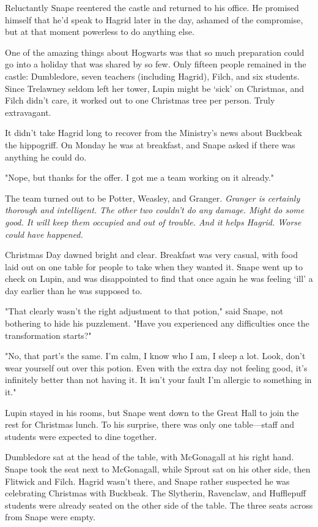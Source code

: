 Reluctantly Snape reentered the castle and returned to his office. He promised himself that he'd speak to Hagrid later in the day, ashamed of the compromise, but at that moment powerless to do anything else.

One of the amazing things about Hogwarts was that so much preparation could go into a holiday that was shared by so few. Only fifteen people remained in the castle: Dumbledore, seven teachers (including Hagrid), Filch, and six students. Since Trelawney seldom left her tower, Lupin might be `sick' on Christmas, and Filch didn't care, it worked out to one Christmas tree per person. Truly extravagant.

It didn't take Hagrid long to recover from the Ministry's news about Buckbeak the hippogriff. On Monday he was at breakfast, and Snape asked if there was anything he could do.

"Nope, but thanks for the offer. I got me a team working on it already."

The team turned out to be Potter, Weasley, and Granger. \emph{Granger is certainly thorough and intelligent. The other two{\el} couldn't do any damage. Might do some good. It will keep them occupied and out of trouble. And it helps Hagrid. Worse could have happened.}

Christmas Day dawned bright and clear. Breakfast was very casual, with food laid out on one table for people to take when they wanted it. Snape went up to check on Lupin, and was disappointed to find that once again he was feeling `ill' a day earlier than he was supposed to.

"That clearly wasn't the right adjustment to that potion," said Snape, not bothering to hide his puzzlement. "Have you experienced any difficulties once the transformation starts?"

"No, that part's the same. I'm calm, I know who I am, I sleep a lot. Look, don't wear yourself out over this potion. Even with the extra day not feeling good, it's infinitely better than not having it. It isn't your fault I'm allergic to something in it."

Lupin stayed in his rooms, but Snape went down to the Great Hall to join the rest for Christmas lunch. To his surprise, there was only one table—staff and students were expected to dine together.

Dumbledore sat at the head of the table, with McGonagall at his right hand. Snape took the seat next to McGonagall, while Sprout sat on his other side, then Flitwick and Filch. Hagrid wasn't there, and Snape rather suspected he was celebrating Christmas with Buckbeak. The Slytherin, Ravenclaw, and Hufflepuff students were already seated on the other side of the table. The three seats across from Snape were empty.

